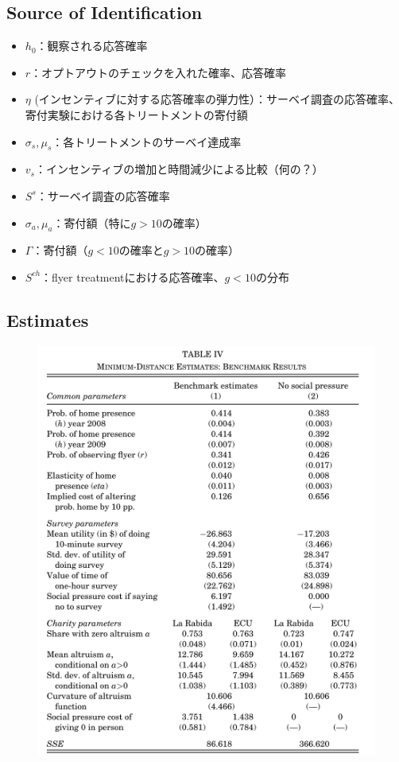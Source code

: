 \documentclass[../root]{subfiles}
\begin{document}
    \subsection{Source of Identification}

    \begin{itemize}
        \item $h_0$：観察される応答確率
        \item $r$：オプトアウトのチェックを入れた確率、応答確率
        \item $\eta$ (インセンティブに対する応答確率の弾力性）：サーベイ調査の応答確率、寄付実験における各トリートメントの寄付額
        \item $\sigma_s, \mu_s$：各トリートメントのサーベイ達成率
        \item $v_s$：インセンティブの増加と時間減少による比較（何の？）
        \item $S^s$：サーベイ調査の応答確率
        \item $\sigma_a, \mu_a$：寄付額（特に$g > 10$の確率）
        \item $\Gamma$：寄付額（$g < 10$の確率と$g > 10$の確率）
        \item $S^{ch}$：flyer treatmentにおける応答確率、$g < 10$の分布
    \end{itemize}


    \subsection{Estimates}

    \begin{figure}[h]
        \centering
        \includegraphics[width = .6\linewidth]{0821kato/fig10_2.png}
        \label{}
    \end{figure}
\end{document}
